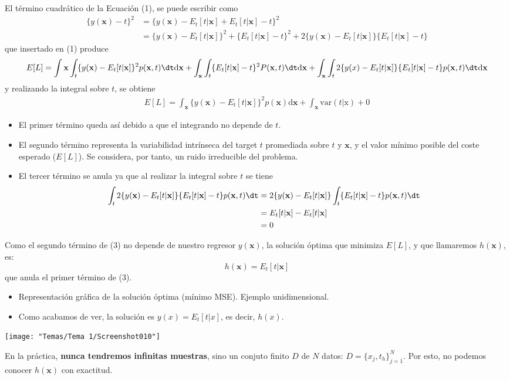 El término cuadrático de la Ecuación (1), se puede escribir como \[\begin{aligned}
	\{y(\mathbf{x})-t\}^2&=\{y(\mathbf{x})-E_t[t|\mathbf{x}]+E_t[t|\mathbf{x}]-t\}^2\\
	&=\{y(\mathbf{x})-E_t[t|\mathbf{x}]\}^2+\{E_t[t|\mathbf{x}]-t\}^2+2\{y(\mathbf{x})-E_t[t|\mathbf{x}]\}\{E_t[t|\mathbf{x}]-t\}
\end{aligned}\] que insertado en (1) produce \[
E[L]=\int\mathbf{x}\int_t\{y(\mathbf{x})-E_t[t|\mathbf{x}]\}^2p(\mathbf{x},t)\dt\mathrm{d}\mathbf{x}+\int_\mathbf{x}\int_t\{E_t[t|\mathbf{x}]-t\}^2P(\mathbf{x},t)\dt\mathrm{d}\mathbf{x}+\int_\mathbf{x}\int_t2\{y(x)-E_t[t|\mathbf{x}]\}\{E_t[t|\mathbf{x}]-t\}p(\mathbf{x},t)\dt\mathrm{d}\mathbf{x}
\] y realizando la integral sobre $t$, se obtiene  \begin{align}
	E[L]=\int_{\mathbf{x}}\{y(\mathbf{x})-E_t[t|\mathbf{x}]\}^2p(\mathbf{x})\mathrm{d}\mathbf{x}+\int_\mathbf{x}\mathrm{var}(t|\mathrm{x})+0 
\end{align}
\begin{itemize}
	\item El primer término queda así debido a que el integrando no depende de $t$.
	\item El segundo término representa la variabilidad intrínseca del target $t$ promediada sobre $t$ y $\mathbf{x}$, y el valor mínimo posible del coste esperado ($E[L]$). Se considera, por tanto, un ruido irreducible del problema.
	\item El tercer término se anula ya que al realizar la integral sobre $t$ se tiene \begin{align*}
		\int_t2\{y(\mathbf{x})-E_t[t|\mathbf{x}]\}\{E_t[t|\mathbf{x}]-t\}p(\mathbf{x},t)\dt&=2\{y(\mathbf{x})-E_t[t|\mathbf{x}]\}\int_t\{E_t[t|\mathbf{x}]-t\}p(\mathbf{x},t)\dt\\
		&=E_t[t|\mathbf{x}]-E_t[t|\mathbf{x}]\\
		&=0
	\end{align*}
\end{itemize}
Como el segundo término de (3) no depende de nuestro regresor $y(\mathbf{x})$, la solución óptima que minimiza $E[L]$, y que llamaremos $h(\mathbf{x})$, es: \[ \boxed{h(\mathbf{x})=E_t[t|\mathbf{x}]} \]que anula el primer término de (3).
\begin{itemize}[label=$-$]
	\item Representación gráfica de la solución óptima (mínimo MSE). Ejemplo unidimensional.
	\item Como acabamos de ver, la solución es $y(x)=E_t[t|x]$, es decir, $h(x)$.
\end{itemize}
\begin{center}
	\texttt{[image: "Temas/Tema 1/Screenshot010"]}
\end{center}
En la práctica, \textbf{nunca tendremos infinitas muestras}, sino un conjuto finito $D$ de $N$ datos: $D=\{x_j,t_h\}_{j=1}^{N}$. Por esto, no podemos conocer $h(\mathbf{x})$ con exactitud.

